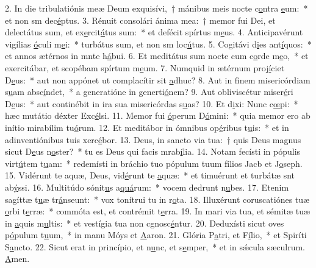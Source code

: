 2. In die tribulatiónis meæ Deum exquisívi,~† mánibus meis nocte c\uline{o}ntra \uline{e}um:~* et non sm dec\uline{é}ptus.
3. Rénuit consolári ánima mea:~† memor fui Dei, et delectátus sum, et ex\uline{e}rcit\uline{á}tus sum:~* et defécit spírtus m\uline{e}us.
4. Anticipavérunt vigílias \uline{ó}culi m\uline{e}i:~* turbátus sum, et non sm loc\uline{ú}tus.
5. Cogitávi d\uline{i}es ant\uline{í}quos:~* et annos ætérnos in mnte h\uline{á}bui.
6. Et meditátus sum nocte cum c\uline{o}rde m\uline{e}o,~* et exercitábar, et scopébam spírtum m\uline{e}um.
7. Numquid in ætérnum proj\uline{í}ciet D\uline{e}us:~* aut non appónet ut complacítir sit \uline{a}dhuc?
8. Aut in finem misericórdiam s\uline{u}am absc\uline{í}ndet,~* a generatióne in generti\uline{ó}nem?
9. Aut obliviscétur miser\uline{é}ri D\uline{e}us:~* aut continébit in ira sua misericórdas s\uline{u}as?
10. Et d\uline{i}xi: Nunc c\uline{œ}pi:~* hæc mutátio déxter Exc\uline{é}lsi.
11. Memor fui \uline{ó}perum D\uline{ó}mini:~* quia memor ero ab inítio mirabílim tu\uline{ó}rum.
12. Et meditábor in ómnibus op\uline{é}ribus t\uline{u}is:~* et in adinventiónibus tuis xerc\uline{é}bor.
13. Deus, in sancto via tua:~† quis Deus magnus sicut D\uline{e}us n\uline{o}ster?~* tu es Deus qui facis mrab\uline{í}lia.
14. Notam fecísti in pópulis virt\uline{ú}tem t\uline{u}am:~* redemísti in bráchio tuo pópulum tuum fílios Jacb et J\uline{o}seph.
15. Vidérunt te aquæ, Deus, vid\uline{é}runt te \uline{a}quæ:~* et timuérunt et turbátæ snt ab\uline{ý}ssi.
16. Multitúdo sónit\uline{u}s a\uline{quá}rum:~* vocem dedrunt n\uline{u}bes.
17. Etenim sagíttæ t\uline{u}æ tr\uline{á}nseunt:~* vox tonítrui tu in r\uline{o}ta.
18. Illuxérunt coruscatiónes tuæ \uline{o}rbi t\uline{e}rræ:~* commóta est, et contrémit t\uline{e}rra.
19. In mari via tua, et sémitæ tuæ in \uline{a}quis m\uline{u}ltis:~* et vestígia tua non cgnosc\uline{é}ntur.
20. Deduxísti sicut oves p\uline{ó}pulum t\uline{u}um,~* in manu Móys et \uline{A}aron.
21. Glória P\uline{a}tri, et F\uline{í}lio,~* et Spiríti S\uline{a}ncto.
22. Sicut erat in princípio, et n\uline{u}nc, et s\uline{e}mper,~* et in sǽcula sæculrum. \uline{A}men.
